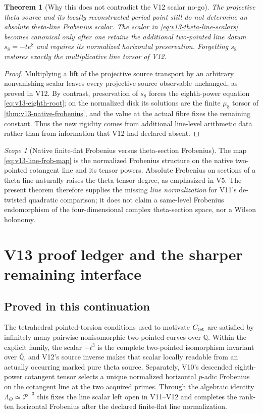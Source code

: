 \documentclass[11pt]{article}
\newtheorem{theorem}{Theorem}[section]
\theoremstyle{definition}
\theoremstyle{remark}
\newtheorem{scope}[scope]{Scope}
\begin{document}
\begin{theorem}[Why this does not contradict the V12 scalar no-go]
\label{thm:v13-no-contradiction}
The projective theta source and its locally reconstructed period point still do
not determine an absolute theta-line Frobenius scalar.  The scalar in
\cref{eq:v13-theta-line-scalars} becomes canonical only after one retains the
additional two-pointed line datum $s_8=-t e^8$ and requires its normalized
horizontal preservation.  Forgetting $s_8$ restores exactly the multiplicative
line torsor of V12.
\end{theorem}

\begin{proof}
Multiplying a lift of the projective source transport by an arbitrary
nonvanishing scalar leaves every projective source observable unchanged, as
proved in V12.  By contrast, preservation of $s_8$ forces the eighth-power
equation \cref{eq:v13-eighth-root}; on the normalized disk its solutions are
the finite $\mu_8$ torsor of \cref{thm:v13-native-frobenius}, and the value at
the actual fibre fixes the remaining constant.  Thus the new rigidity comes
from additional line-level arithmetic data rather than from information that
V12 had declared absent.
\end{proof}

\begin{scope}[Native finite-flat Frobenius versus theta-section Frobenius]
The map \cref{eq:v13-line-frob-map} is the normalized Frobenius structure on
the native two-pointed cotangent line and its tensor powers.  Absolute
Frobenius on sections of a theta line naturally raises the theta tensor degree,
as emphasized in V5.  The present theorem therefore supplies the missing
\emph{line normalization} for V11's de-twisted quadratic comparison; it does
not claim a same-level Frobenius endomorphism of the four-dimensional complex
theta-section space, nor a Wilson holonomy.
\end{scope}

\section{V13 proof ledger and the sharper remaining interface}
\label{sec:v13-status}

\subsection{Proved in this continuation}
The tetrahedral pointed-torsion conditions used to motivate $C_{\rm tet}$ are
satisfied by infinitely many pairwise nonisomorphic two-pointed curves over
$\mathbb Q$.  Within the explicit family, the scalar $-t^3$ is the complete
two-pointed isomorphism invariant over $\overline{\mathbb Q}$, and V12's
source inverse makes that scalar locally readable from an actually occurring
marked pure theta source.  Separately, V10's descended eighth-power cotangent
tensor selects a unique normalized horizontal $p$-adic Frobenius on the
cotangent line at the two acquired primes.  Through the algebraic identity
$\Lambda_\Theta\simeq\mathscr P^{-3}$ this fixes the line scalar left open in
V11--V12 and completes the rank-ten horizontal Frobenius after the declared
finite-flat line normalization.
\end{document}
